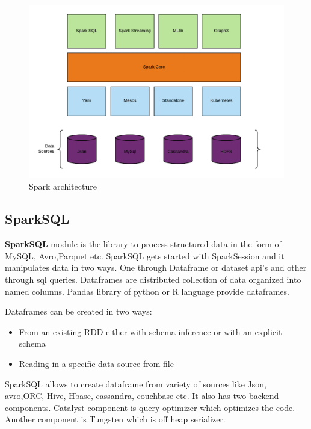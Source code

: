 \begin{figure}[!ht]
  \centering\includegraphics[width=\columnwidth]{images/Sparkarchitecture.png} \caption{Spark
  architecture}\label{f:fig2}
\end{figure}

\subsection{SparkSQL}

{\bf SparkSQL} module is the library to process structured data in the form of MySQL, Avro,Parquet
etc. SparkSQL gets started with SparkSession and it manipulates data in two ways. One through Dataframe
or dataset api's and other through sql queries. Dataframes are distributed collection of data
organized into named columns. Pandas library of python or R language provide dataframes.

Dataframes can be created in two ways:

\begin{itemize}
   \item From an existing RDD either with schema inference or with an explicit schema
   \item Reading in a specific data source from file
\end{itemize}

SparkSQL allows to create dataframe from variety of sources like Json, avro,ORC, Hive, Hbase,
cassandra, couchbase etc. It also has two backend components. Catalyst component is  query optimizer
which optimizes the code. Another component is Tungsten which is off heap serializer.
 

